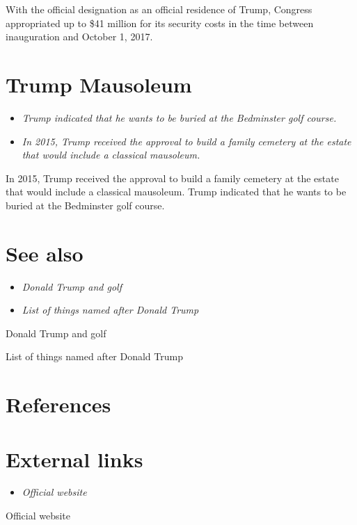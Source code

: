 With the official designation as an official residence of Trump,
Congress appropriated up to \$41 million for its security costs in the
time between inauguration and October 1, 2017.

\section{Trump Mausoleum}\label{trump-mausoleum}

\begin{itemize}
\item
  \emph{Trump indicated that he wants to be buried at the Bedminster
  golf course.}
\item
  \emph{In 2015, Trump received the approval to build a family cemetery
  at the estate that would include a classical mausoleum.}
\end{itemize}

In 2015, Trump received the approval to build a family cemetery at the
estate that would include a classical mausoleum. Trump indicated that he
wants to be buried at the Bedminster golf course.

\section{See also}\label{see-also}

\begin{itemize}
\item
  \emph{Donald Trump and golf}
\item
  \emph{List of things named after Donald Trump}
\end{itemize}

Donald Trump and golf

List of things named after Donald Trump

\section{References}\label{references}

\section{External links}\label{external-links}

\begin{itemize}
\item
  \emph{Official website}
\end{itemize}

Official website
